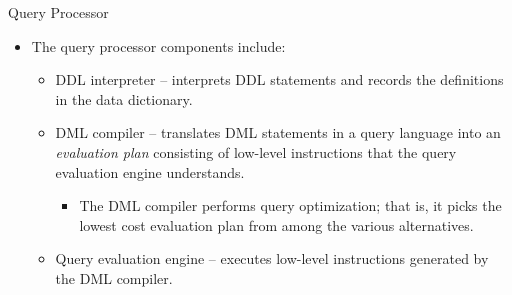 \documentclass{beamer}
\begin{document}
\begin{frame}{Query Processor}
    \begin{itemize}
        \item The query processor components include:
        \begin{itemize}
            \item DDL  interpreter --  interprets DDL statements and records the definitions in the data dictionary.
            \item DML compiler -- translates DML statements in a query language into an \textit{evaluation plan} consisting of low-level instructions that the query evaluation engine understands.
            \begin{itemize}
                \item The DML compiler performs query optimization; that is, it picks the lowest cost evaluation plan from among the various alternatives.
            \end{itemize}
            \item Query evaluation engine -- executes low-level instructions generated by the DML compiler.
        \end{itemize}
    \end{itemize}
\end{frame}
\end{document}

